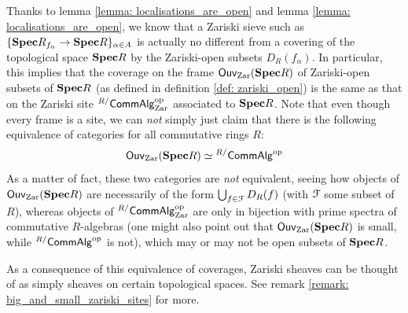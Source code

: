                     \begin{corollary} \label{coro: zariski_frames_and_sites}
                        Thanks to lemma \ref{lemma: localisations_are_open} and lemma \ref{lemma: localisations_are_open}, we know that a Zariski sieve such as $\{\mathbf{Spec} R_{f_{\alpha}} \to \mathbf{Spec} R\}_{\alpha \in A}$ is actually no different from a covering of the topological space $\mathbf{Spec} R$ by the Zariski-open subsets $D_R(f_{\alpha})$. In particular, this implies that the coverage on the frame $\mathsf{Ouv}_{\mathrm{Zar}}(\mathbf{Spec} R)$ of Zariski-open subsets of $\mathbf{Spec} R$ (as defined in definition \ref{def: zariski_open}) is the same as that on the Zariski site ${}^{R/}\mathsf{Comm}\mathsf{Alg}_{\mathrm{Zar}}^{\mathrm{op}}$ associated to $\mathbf{Spec} R$. Note that even though every frame is a site, we can \textit{not} simply just claim that there is the following equivalence of categories for all commutative rings $R$:
                            $$\mathsf{Ouv}_{\mathrm{Zar}}(\mathbf{Spec} R) \simeq {}^{R/}\mathsf{Comm}\mathsf{Alg}^{\mathrm{op}}$$
                        As a matter of fact, these two categories are \textit{not} equivalent, seeing how objects of $\mathsf{Ouv}_{\mathrm{Zar}}(\mathbf{Spec} R)$ are necessarily of the form $\bigcup_{f \in \mathcal{F}} D_R(f)$ (with $\mathcal{F}$ some subset of $R$), whereas objects of ${}^{R/}\mathsf{Comm}\mathsf{Alg}_{\mathrm{Zar}}^{\mathrm{op}}$ are only in bijection with prime spectra of commutative $R$-algebras (one might also point out that $\mathsf{Ouv}_{\mathrm{Zar}}(\mathbf{Spec} R)$ is small, while ${}^{R/}\mathsf{Comm}\mathsf{Alg}^{\mathrm{op}}$ is not), which may or may not be open subsets of $\mathbf{Spec} R$. 
                        
                        As a consequence of this equivalence of coverages, Zariski sheaves can be thought of as simply sheaves on certain topological spaces. See remark \ref{remark: big_and_small_zariski_sites} for more.
                    \end{corollary}
